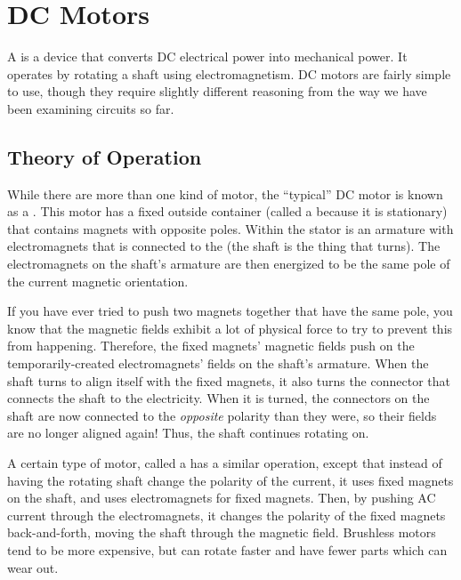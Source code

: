 \chapter{DC Motors}


A  is a device that converts DC electrical power into mechanical power.
It operates by rotating a shaft using electromagnetism.
DC motors are fairly simple to use, though they require slightly different reasoning from the way we have been examining circuits so far.

\section{Theory of Operation}

While there are more than one kind of motor, the ``typical'' DC motor is known as a .
This motor has a fixed outside container (called a  because it is stationary) that contains magnets with opposite poles.
Within the stator is an armature with electromagnets that is connected to the  (the shaft is the thing that turns).
The electromagnets on the shaft's armature are then energized to be the same pole of the current magnetic orientation.

If you have ever tried to push two magnets together that have the same pole, you know that the magnetic fields exhibit a lot of physical force to try to prevent this from happening. 
Therefore, the fixed magnets' magnetic fields push on the temporarily-created electromagnets' fields on the shaft's armature.
When the shaft turns to align itself with the fixed magnets, it also turns the connector that connects the shaft to the electricity.
When it is turned, the connectors on the shaft are now connected to the \emph{opposite} polarity than they were, so their fields are no longer aligned again!
Thus, the shaft continues rotating on.

A certain type of motor, called a  has a similar operation, except that instead of having the rotating shaft change the polarity of the current, it uses fixed magnets on the shaft, and uses electromagnets for fixed magnets.  
Then, by pushing AC current through the electromagnets, it changes the polarity of the fixed magnets back-and-forth, moving the shaft through the magnetic field.
Brushless motors tend to be more expensive, but can rotate faster and have fewer parts which can wear out.

